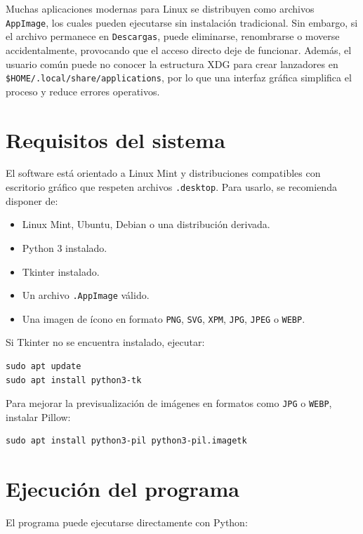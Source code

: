 \documentclass[11pt,a4paper]{article}
\begin{document}
Muchas aplicaciones modernas para Linux se distribuyen como archivos \texttt{AppImage}, los cuales pueden ejecutarse sin instalación tradicional. Sin embargo, si el archivo permanece en \texttt{Descargas}, puede eliminarse, renombrarse o moverse accidentalmente, provocando que el acceso directo deje de funcionar. Además, el usuario común puede no conocer la estructura XDG para crear lanzadores en \texttt{\$HOME/.local/share/applications}, por lo que una interfaz gráfica simplifica el proceso y reduce errores operativos.

\section{Requisitos del sistema}

El software está orientado a Linux Mint y distribuciones compatibles con escritorio gráfico que respeten archivos \texttt{.desktop}. Para usarlo, se recomienda disponer de:

\begin{itemize}[leftmargin=1.2cm]
    \item Linux Mint, Ubuntu, Debian o una distribución derivada.
    \item Python 3 instalado.
    \item Tkinter instalado.
    \item Un archivo \texttt{.AppImage} válido.
    \item Una imagen de ícono en formato \texttt{PNG}, \texttt{SVG}, \texttt{XPM}, \texttt{JPG}, \texttt{JPEG} o \texttt{WEBP}.
\end{itemize}

Si Tkinter no se encuentra instalado, ejecutar:

\begin{lstlisting}[style=bashstyle]
sudo apt update
sudo apt install python3-tk
\end{lstlisting}

Para mejorar la previsualización de imágenes en formatos como \texttt{JPG} o \texttt{WEBP}, instalar Pillow:

\begin{lstlisting}[style=bashstyle]
sudo apt install python3-pil python3-pil.imagetk
\end{lstlisting}

\section{Ejecución del programa}

El programa puede ejecutarse directamente con Python:
\end{document}
